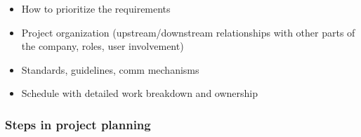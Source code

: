 \documentclass{article}
\begin{document}
\begin{itemize}
\begin{itemize}
\begin{itemize}
            \item How to prioritize the requirements
            
            \item Project organization (upstream/downstream relationships with other parts of the company, roles, user involvement)
            
            \item Standards, guidelines, comm mechanisms
            
            \item Schedule with detailed work breakdown and ownership
        \end{itemize}
    \end{itemize}
\end{itemize}

\subsubsection{Steps in project planning}
\end{document}
